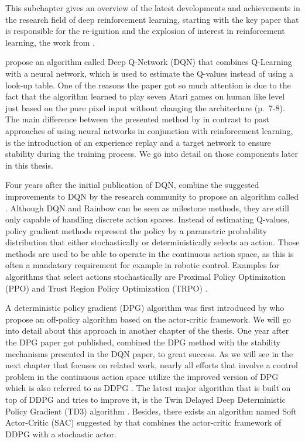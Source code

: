 This subchapter gives an overview of the latest developments and achievements in the research field of deep reinforcement learning, starting with the key paper that is responsible for the re-ignition and the explosion of interest in reinforcement learning, the work from \cite{mnih2013playing, mnih2015human}.
\par 
\cite{mnih2013playing} propose an algorithm called Deep Q-Network
(DQN) that combines Q-Learning with a neural network, which is used to estimate the Q-values instead of using a look-up table. One of the reasons the paper got so much attention is due to the fact that the algorithm learned to play seven Atari games on human like level just based on the pure pixel input without changing the architecture (p.~7-8).
\newpage
The main difference between the presented method by \cite{mnih2013playing} in contrast to past approaches of using neural networks in conjunction with reinforcement learning, is the introduction of an experience replay and a target network to ensure stability during the training process. We go into detail on those components later in this thesis.
\par
Four years after the initial publication of DQN, \cite{hessel2018rainbow} combine the suggested improvements to DQN by the research community to propose an algorithm called . Although DQN and Rainbow can be seen as milestone methods, they are still only capable of handling discrete action spaces. Instead of estimating Q-values, policy gradient methods represent the policy by a parametric probability distribution that either stochastically or deterministically selects an action. Those methods are used to be able to operate in the continuous action space, as this is often a mandatory requirement for example in robotic control. Examples for algorithms that select actions stochastically are Proximal Policy Optimization (PPO) \cite[]{schulman2017proximal} and Trust Region Policy Optimization (TRPO) \cite[]{schulman2017trust}.
\par 
A deterministic policy gradient (DPG) algorithm was first introduced by \cite{silver2014deterministic} who propose an off-policy algorithm based on the actor-critic framework. We will go into detail about this approach in another chapter of the thesis. One year after the DPG paper got published, \cite{lillicrap2019continuous} combined the DPG method with the stability mechanisms presented in the DQN paper, to great success. As we will see in the next chapter that focuses on related work, nearly all efforts that involve  a control problem in the continuous action space utilize the improved version of DPG which is also referred to as DDPG \cite[p.~2]{lillicrap2019continuous}. The latest major algorithm that is built on top of DDPG and tries to improve it, is the Twin Delayed Deep Deterministic Policy Gradient (TD3) algorithm \cite[]{fujimoto2018addressing}. Besides, there exists an algorithm named Soft Actor-Critic (SAC) suggested by \cite{haarnoja2018soft} that combines the actor-critic framework of DDPG with a stochastic actor.
